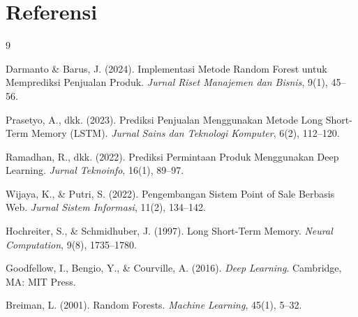 \documentclass[a4paper,10pt,onecolumn]{article}
\begin{document}
\section*{\fontsize{11pt}{13pt}\selectfont Referensi}
{\fontsize{9pt}{11pt}\selectfont
\begin{thebibliography}{9}
\setlength{\itemsep}{0pt}

Darmanto \& Barus, J. (2024). Implementasi Metode Random Forest untuk Memprediksi Penjualan Produk. \textit{Jurnal Riset Manajemen dan Bisnis}, 9(1), 45--56.

Prasetyo, A., dkk. (2023). Prediksi Penjualan Menggunakan Metode Long Short-Term Memory (LSTM). \textit{Jurnal Sains dan Teknologi Komputer}, 6(2), 112--120.

Ramadhan, R., dkk. (2022). Prediksi Permintaan Produk Menggunakan Deep Learning. \textit{Jurnal Teknoinfo}, 16(1), 89--97.

Wijaya, K., \& Putri, S. (2022). Pengembangan Sistem Point of Sale Berbasis Web. \textit{Jurnal Sistem Informasi}, 11(2), 134--142.

Hochreiter, S., \& Schmidhuber, J. (1997). Long Short-Term Memory. \textit{Neural Computation}, 9(8), 1735--1780.

Goodfellow, I., Bengio, Y., \& Courville, A. (2016). \textit{Deep Learning}. Cambridge, MA: MIT Press.

Breiman, L. (2001). Random Forests. \textit{Machine Learning}, 45(1), 5--32.

\end{thebibliography}
}
\end{document}
